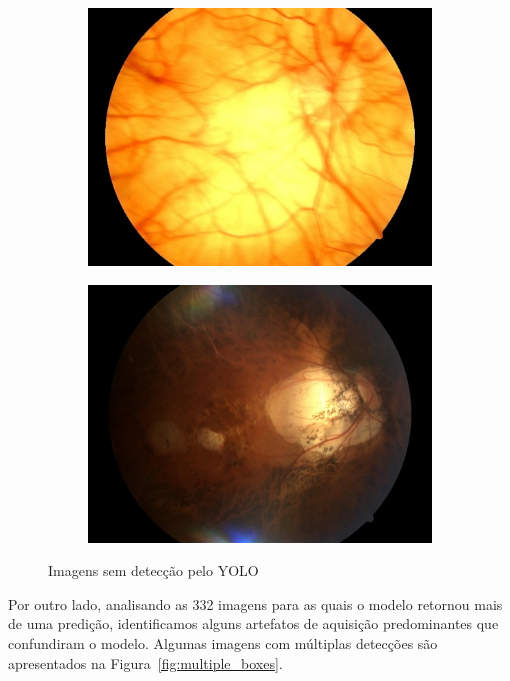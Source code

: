 \documentclass[12pt]{article}
\begin{document}
\begin{figure}
\begin{subfigure}[b]{0.47\textwidth}
        \includegraphics[width=\textwidth]{images/no_box/TRAIN046833_boxes.jpg}
        \label{fig:images_no_box_3}
    \end{subfigure}
    \hfill
    \begin{subfigure}[b]{0.47\textwidth}
        \centering
        \includegraphics[width=\textwidth]{images/no_box/TRAIN099284_boxes.jpg}
        \label{fig:images_no_box_4}
    \end{subfigure}
    \caption{Imagens sem detecção pelo YOLO}
    \label{fig:images_no_box}
\end{figure}

Por outro lado, analisando as 332 imagens para as quais o modelo retornou mais de uma predição, identificamos alguns artefatos de aquisição predominantes que confundiram o modelo. Algumas imagens com múltiplas detecções são apresentados na Figura~\ref{fig:multiple_boxes}.
\end{document}
